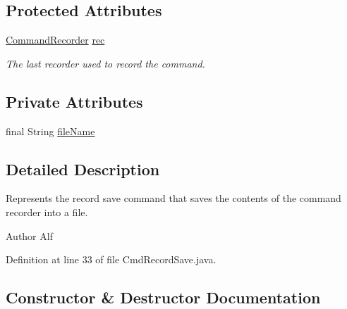\subsection*{Protected Attributes}
\begin{DoxyCompactItemize}
\item 
\hyperlink{classgov_1_1nasa_1_1jpf_1_1inspector_1_1client_1_1_command_recorder}{Command\+Recorder} \hyperlink{classgov_1_1nasa_1_1jpf_1_1inspector_1_1client_1_1_client_command_af4246f2427035c72a6af45a2c61361f7}{rec}
\begin{DoxyCompactList}\small\item\em The last recorder used to record the command. \end{DoxyCompactList}\end{DoxyCompactItemize}
\subsection*{Private Attributes}
\begin{DoxyCompactItemize}
\item 
final String \hyperlink{classgov_1_1nasa_1_1jpf_1_1inspector_1_1client_1_1commands_1_1_cmd_record_save_a7dbe446c5de22c4c43ae96f83044ac03}{file\+Name}
\end{DoxyCompactItemize}


\subsection{Detailed Description}
Represents the \textquotesingle{}record save\textquotesingle{} command that saves the contents of the command recorder into a file. 

\begin{DoxyAuthor}{Author}
Alf 
\end{DoxyAuthor}


Definition at line 33 of file Cmd\+Record\+Save.\+java.



\subsection{Constructor \& Destructor Documentation}
